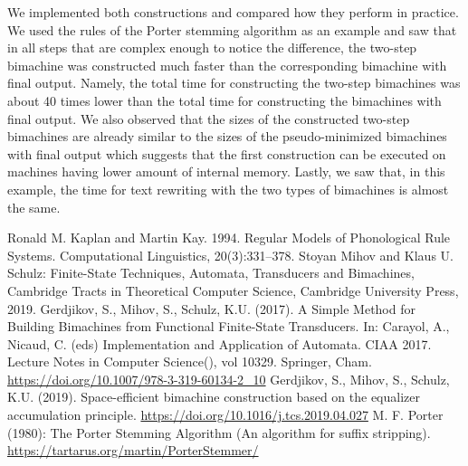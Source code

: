 \documentclass{article}
\begin{document}
	We implemented both constructions and compared how they perform in practice.
	We used the rules of the Porter stemming algorithm as an example and saw that in all steps that are complex enough to notice the difference, the two-step bimachine was constructed much faster than the corresponding bimachine with final output.
	Namely, the total time for constructing the two-step bimachines was about 40 times lower than the total time for constructing the bimachines with final output.
	We also observed that the sizes of the constructed two-step bimachines are already similar to the sizes of the pseudo-minimized bimachines with final output which suggests that the first construction can be executed on machines having lower amount of internal memory.
	Lastly, we saw that, in this example, the time for text rewriting with the two types of bimachines is almost the same.

	\begin{thebibliography}{9}
		Ronald M. Kaplan and Martin Kay. 1994. Regular Models of Phonological Rule Systems. Computational Linguistics, 20(3):331–378.
		Stoyan Mihov and Klaus U. Schulz: Finite-State Techniques, Automata, Transducers and Bimachines, Cambridge Tracts in Theoretical Computer Science, Cambridge University Press, 2019.
		Gerdjikov, S., Mihov, S., Schulz, K.U. (2017). A Simple Method for Building Bimachines from Functional Finite-State Transducers. In: Carayol, A., Nicaud, C. (eds) Implementation and Application of Automata. CIAA 2017. Lecture Notes in Computer Science(), vol 10329. Springer, Cham. \url{https://doi.org/10.1007/978-3-319-60134-2_10}
		Gerdjikov, S., Mihov, S., Schulz, K.U. (2019). Space-efficient bimachine construction based on the equalizer accumulation principle. \url{https://doi.org/10.1016/j.tcs.2019.04.027}
		M. F. Porter (1980): The Porter Stemming Algorithm (An algorithm for suffix stripping).
		\url{https://tartarus.org/martin/PorterStemmer/}
	\end{thebibliography}
\end{document}
